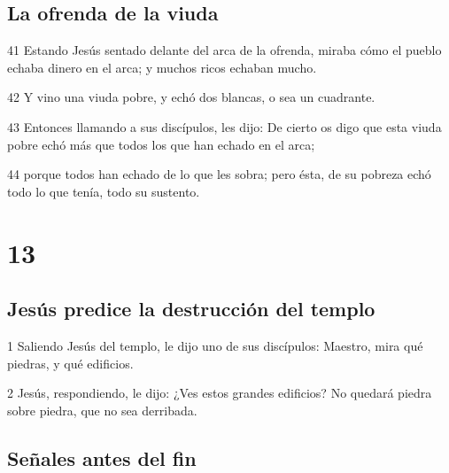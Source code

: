 \section*{La ofrenda de la viuda}

\par 41 Estando Jesús sentado delante del arca de la ofrenda, miraba cómo el pueblo echaba dinero en el arca; y muchos ricos echaban mucho.
\par 42 Y vino una viuda pobre, y echó dos blancas, o sea un cuadrante.
\par 43 Entonces llamando a sus discípulos, les dijo: De cierto os digo que esta viuda pobre echó más que todos los que han echado en el arca;
\par 44 porque todos han echado de lo que les sobra; pero ésta, de su pobreza echó todo lo que tenía, todo su sustento.

\chapter{13}

\section*{Jesús predice la destrucción del templo}

\par 1 Saliendo Jesús del templo, le dijo uno de sus discípulos: Maestro, mira qué piedras, y qué edificios.
\par 2 Jesús, respondiendo, le dijo: ¿Ves estos grandes edificios? No quedará piedra sobre piedra, que no sea derribada.

\section*{Señales antes del fin}

